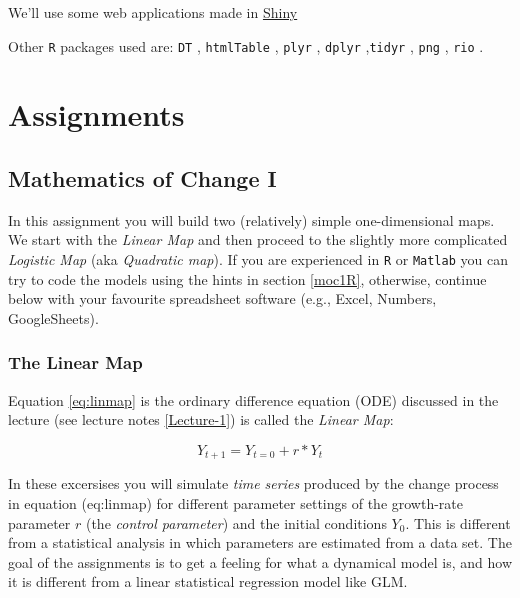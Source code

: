 \documentclass[]{book}
\let\stdsection\section
\renewcommand\section{\newpage\stdsection}
\begin{document}
We'll use some web applications made in
\href{http://shiny.rstudio.com}{Shiny} \citep{R-shiny}

Other \texttt{R} packages used are: \texttt{DT} \citep{R-DT},
\texttt{htmlTable} \citep{R-htmlTable}, \texttt{plyr} \citep{R-plyr},
\texttt{dplyr} \citep{R-dplyr},\texttt{tidyr} \citep{R-tidyr},
\texttt{png} \citep{R-png}, \texttt{rio} \citep{R-rio}.

\part{Assignments}\label{part-assignments}

\chapter{Mathematics of Change I}\label{moc1ass}

In this assignment you will build two (relatively) simple
one-dimensional maps. We start with the \emph{Linear Map} and then
proceed to the slightly more complicated \emph{Logistic Map} (aka
\emph{Quadratic map}). If you are experienced in \texttt{R} or
\texttt{Matlab} you can try to code the models using the hints in
section \ref{moc1R}, otherwise, continue below with your favourite
spreadsheet software (e.g., Excel, Numbers, GoogleSheets).

\section{The Linear Map}\label{the-linear-map}

Equation \eqref{eq:linmap} is the ordinary difference equation (ODE)
discussed in the lecture (see lecture notes \ref{Lecture-1}) is called
the \emph{Linear Map}:

\begin{equation}
Y_{t+1} = Y_{t=0} + r*Y_t
\label{eq:linmap}
\end{equation}

In these excersises you will simulate \emph{time series} produced by the
change process in equation (eq:linmap) for different parameter
settings of the growth-rate parameter \(r\) (the \emph{control
parameter}) and the initial conditions \(Y_0\). This is different from a
statistical analysis in which parameters are estimated from a data set.
The goal of the assignments is to get a feeling for what a dynamical
model is, and how it is different from a linear statistical regression
model like GLM.
\end{document}
